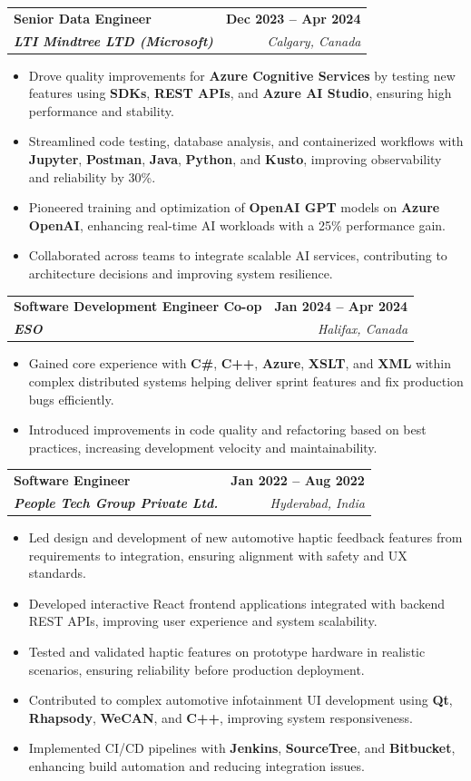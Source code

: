 \documentclass[letterpaper,11pt]{article}
\makeatletter
\newcommand{\resumeItem}[1]{
  \item\small{
    {#1 \vspace{-2pt}}
  }
}
\newcommand{\resumeSubheading}[4]{
  \vspace{-2pt}\item
    \begin{tabular*}{1.0\textwidth}[t]{l@{\extracolsep{\fill}}r}
      \textbf{#1} & \textbf{\small #2} \\
      \textit{\small#3} & \textit{\small #4} \\
    \end{tabular*}\vspace{-7pt}
}
\newcommand{\resumeItemListStart}{\begin{itemize}}
\newcommand{\resumeItemListEnd}{\end{itemize}\vspace{-5pt}}
\makeatother
\begin{document}
    \resumeSubheading
      {\textbf{Senior Data Engineer}}{\textbf{Dec 2023 -- Apr 2024}}
      {\textbf{LTI Mindtree LTD (Microsoft)}}{Calgary, Canada}
      \resumeItemListStart
        \resumeItem{Drove quality improvements for \textbf{Azure Cognitive Services} by testing new features using \textbf{SDKs}, \textbf{REST APIs}, and \textbf{Azure AI Studio}, ensuring high performance and stability.}
        \resumeItem{Streamlined code testing, database analysis, and containerized workflows with \textbf{Jupyter}, \textbf{Postman}, \textbf{Java}, \textbf{Python}, and \textbf{Kusto}, improving observability and reliability by 30\%.}
        \resumeItem{Pioneered training and optimization of \textbf{OpenAI GPT} models on \textbf{Azure OpenAI}, enhancing real-time AI workloads with a 25\% performance gain.}
        \resumeItem{Collaborated across teams to integrate scalable AI services, contributing to architecture decisions and improving system resilience.}
      \resumeItemListEnd
    
    \resumeSubheading
      {\textbf{Software Development Engineer Co-op}}{\textbf{Jan 2024 -- Apr 2024}}
      {\textbf{ESO}}{Halifax, Canada}
      \resumeItemListStart
        \resumeItem{Gained core experience with \textbf{C\#}, \textbf{C++}, \textbf{Azure}, \textbf{XSLT}, and \textbf{XML} within complex distributed systems helping deliver sprint features and fix production bugs efficiently.}
        \resumeItem{Introduced improvements in code quality and refactoring based on best practices, increasing development velocity and maintainability.}
      \resumeItemListEnd

    \resumeSubheading
      {\textbf{Software Engineer}}{\textbf{Jan 2022 -- Aug 2022}}
      {\textbf{People Tech Group Private Ltd.}}{Hyderabad, India}
      \resumeItemListStart
        \resumeItem{Led design and development of new automotive haptic feedback features from requirements to integration, ensuring alignment with safety and UX standards.}
        \resumeItem{Developed interactive React frontend applications integrated with backend REST APIs, improving user experience and system scalability.}
        \resumeItem{Tested and validated haptic features on prototype hardware in realistic scenarios, ensuring reliability before production deployment.}
        \resumeItem{Contributed to complex automotive infotainment UI development using \textbf{Qt}, \textbf{Rhapsody}, \textbf{WeCAN}, and \textbf{C++}, improving system responsiveness.}
        \resumeItem{Implemented CI/CD pipelines with \textbf{Jenkins}, \textbf{SourceTree}, and \textbf{Bitbucket}, enhancing build automation and reducing integration issues.}
      \resumeItemListEnd
\end{document}
